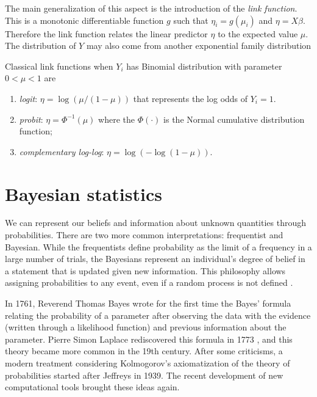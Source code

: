 The main generalization of this aspect is the introduction of the 
\textit{link function}. This is a monotonic differentiable function $g$ 
such that $\eta_i = g(\mu_i)$ and $\eta = X\beta$. Therefore the link 
function relates the linear predictor $\eta$ to the expected value $\mu$. 
The distribution of $Y$ 
may also come from another exponential family distribution 

Classical link functions when $Y_i$ has Binomial distribution with 
parameter $0 < \mu < 1$ are 

\begin{enumerate}
  \item \textit{logit}: $\eta = \log(\mu / (1 - \mu))$ that represents 
  the log odds of $Y_i = 1$. 
  \item \textit{probit}: $\eta = \Phi^{-1}(\mu)$ where the $\Phi(\cdot)$ 
  is the Normal cumulative distribution function; 
  \item \textit{complementary log-log}: $\eta = \log(-\log(1 - \mu))$.
\end{enumerate}


\section{Bayesian statistics}
\label{sec:bayesian_statistics}

We can represent our beliefs and information about unknown quantities 
through probabilities. There are two more common interpretations: 
frequentist and Bayesian. While the frequentists define
probability as the limit of a frequency in a large number of trials, the
Bayesians represent an individual's degree of belief in a statement that is
updated given new information. This philosophy allows assigning probabilities
to any event, even if a random process is not defined \cite{statisticat2016laplacesdemon}. 

In 1761, Reverend Thomas Bayes wrote for the first time the Bayes' formula
relating the probability of a parameter after observing the data with the
evidence (written through a likelihood function) and previous information
about the parameter. Pierre Simon Laplace rediscovered this formula in 1773
\cite{Robert2007}, and this theory became more common in the 19th century.
After some criticisms, a modern treatment considering Kolmogorov's
axiomatization of the theory of probabilities started after Jeffreys in 1939.
The recent development of new computational tools brought these ideas again.

